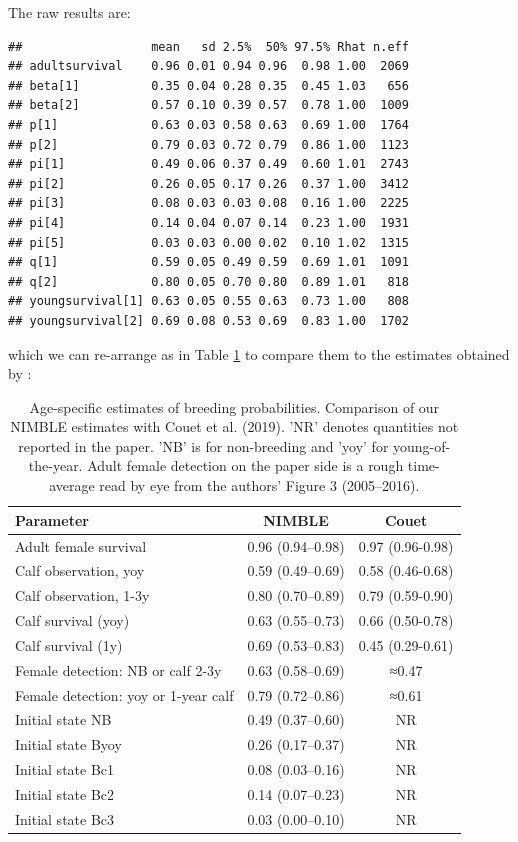 \documentclass[
  12pt,
]{krantz}
\begin{document}
The raw results are:

\begin{verbatim}
##                  mean   sd 2.5%  50% 97.5% Rhat n.eff
## adultsurvival    0.96 0.01 0.94 0.96  0.98 1.00  2069
## beta[1]          0.35 0.04 0.28 0.35  0.45 1.03   656
## beta[2]          0.57 0.10 0.39 0.57  0.78 1.00  1009
## p[1]             0.63 0.03 0.58 0.63  0.69 1.00  1764
## p[2]             0.79 0.03 0.72 0.79  0.86 1.00  1123
## pi[1]            0.49 0.06 0.37 0.49  0.60 1.01  2743
## pi[2]            0.26 0.05 0.17 0.26  0.37 1.00  3412
## pi[3]            0.08 0.03 0.03 0.08  0.16 1.00  2225
## pi[4]            0.14 0.04 0.07 0.14  0.23 1.00  1931
## pi[5]            0.03 0.03 0.00 0.02  0.10 1.02  1315
## q[1]             0.59 0.05 0.49 0.59  0.69 1.01  1091
## q[2]             0.80 0.05 0.70 0.80  0.89 1.01   818
## youngsurvival[1] 0.63 0.05 0.55 0.63  0.73 1.00   808
## youngsurvival[2] 0.69 0.08 0.53 0.69  0.83 1.00  1702
\end{verbatim}

which we can re-arrange as in Table \ref{tab:dolphin} to compare them to the estimates obtained by \citet{couet2019}:

\begin{table}

\caption{\label{tab:dolphin}Age-specific estimates of breeding probabilities. Comparison of our NIMBLE estimates with Couet et al. (2019). 'NR' denotes quantities not reported in the paper. 'NB' is for non-breeding and 'yoy' for young-of-the-year. Adult female detection on the paper side is a rough time-average read by eye from the authors' Figure 3 (2005–2016).}
\centering
\begin{tabular}[t]{l|c|c}
\hline
Parameter & NIMBLE & Couet\\
\hline
Adult female survival & 0.96 (0.94–0.98) & 0.97 (0.96-0.98)\\
\hline
Calf observation, yoy & 0.59 (0.49–0.69) & 0.58 (0.46-0.68)\\
\hline
Calf observation, 1-3y & 0.80 (0.70–0.89) & 0.79 (0.59-0.90)\\
\hline
Calf survival (yoy) & 0.63 (0.55–0.73) & 0.66 (0.50-0.78)\\
\hline
Calf survival (1y) & 0.69 (0.53–0.83) & 0.45 (0.29-0.61)\\
\hline
Female detection: NB or calf 2-3y & 0.63 (0.58–0.69) & ≈0.47\\
\hline
Female detection: yoy or 1-year calf & 0.79 (0.72–0.86) & ≈0.61\\
\hline
Initial state NB & 0.49 (0.37–0.60) & NR\\
\hline
Initial state Byoy & 0.26 (0.17–0.37) & NR\\
\hline
Initial state Bc1 & 0.08 (0.03–0.16) & NR\\
\hline
Initial state Bc2 & 0.14 (0.07–0.23) & NR\\
\hline
Initial state Bc3 & 0.03 (0.00–0.10) & NR\\
\hline
\end{tabular}
\end{table}
\end{document}
